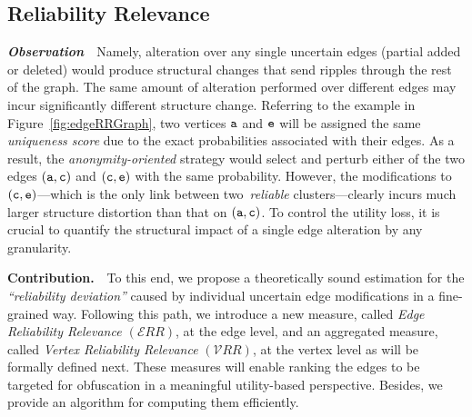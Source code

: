 \subsection{Reliability Relevance}

\textbf{\emph{Observation}}~~Namely, alteration over any single uncertain edges (partial added or deleted) would produce structural changes that send ripples through the rest of the graph. 
The same amount of alteration performed over different edges may incur significantly different structure change. 
Referring to the example in Figure~\ref{fig:edgeRRGraph}, two vertices $\tt{a}$ and $\tt{e}$ will be assigned the same {\em uniqueness score} due to the exact probabilities associated with their edges. 
As a result, the {\em anonymity-oriented} strategy would select and perturb either of the two edges $(\tt{a},\tt{c})$ and $(\tt{c},\tt{e})$ with the same probability. However, the modifications to $(\tt{c},\tt{e})$---which is the only link between two~\emph{reliable} clusters---clearly incurs much larger structure distortion than that on $(\tt{a},\tt{c})$. To control the utility loss, it is crucial to quantify the structural impact of a single edge alteration by any granularity. 



\textbf{Contribution.}~~To this end, we propose a theoretically sound estimation for the {\em ``reliability deviation''} caused by individual uncertain edge modifications in a fine-grained way. 
Following this path, we introduce a new measure, called {\em Edge Reliability Relevance $(\mathcal{E}RR)$}, at the edge level, and an aggregated measure, called {\em Vertex Reliability Relevance} $(\mathcal{V}RR)$, at the vertex level as will be formally defined next. These measures will enable ranking the edges to be targeted for obfuscation in a meaningful utility-based perspective. Besides, we provide an algorithm for computing them efficiently. 


